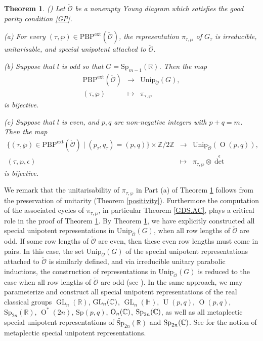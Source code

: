 \documentclass[lang = american]{ems-icm} %
\newcommand{\Z}{\mathbb{Z}}
\newcommand{\R}{\mathbb R}
\def\Sp{{\mathrm{Sp}}}
\newcommand{\GL}{\operatorname{GL}}
\newcommand{\oO}{\operatorname{O}}
\newcommand{\oU}{\operatorname{U}}
\newcommand{\CO}{{\mathcal {O}}}
\numberwithin{equation}{section}
\newtheorem{thm}{Theorem}[section]
\theoremstyle{remark}
\newtheorem*{remark}{Remark}
\begin{document}

\begin{thm}\emph{(\cite{BMSZ3})}
\label{thmclassify} Let $\check \CO$ be a nonempty Young diagram which satisfies the good parity condition \eqref{GP}.

\noindent (a) For every $(\tau,\wp)\in \mathrm{PBP}^{\mathrm{ext}}(\check \CO)$, the representation $\pi_{\tau,\wp}$ of $G_\tau$  is irreducible, unitarisable, and special unipotent attached to $\check \CO$.

\noindent  (b) Suppose that $l$ is odd so that $G=\Sp_{m-1}(\R)$. Then the map
\[
\begin{array}{rcl}
\mathrm{PBP}^{\mathrm{ext}}(\check \CO)&\rightarrow &\mathrm{Unip}_{\check \CO}(G),\\
  (\tau,\wp) &\mapsto& \pi_{\tau,\wp}
  \end{array}
\]
is bijective.

\noindent  (c) Suppose that $l$ is even, and $p,q$ are non-negative integers with $p+q=m$. Then the map
\[
\begin{array}{rcl}
\{(\tau, \wp)\in\mathrm{PBP}^{\mathrm{ext}}(\check \CO)\mid (p_\tau,q_\tau)=(p,q)\} \times \Z/2\Z&\rightarrow &\mathrm{Unip}_{\check \CO}(\oO(p,q)),\\
  (\tau, \wp, \epsilon)&\mapsto& \pi_{\tau,\wp}\otimes \det^\epsilon
  \end{array}
\]
is bijective.


\end{thm}

We remark that the unitarisability of $\pi_{\tau,\wp}$ in Part (a) of Theorem \ref{thmclassify} follows from the preservation of unitarity (Theorem \ref{positivity}). Furthermore the
computation of the associated cycles of $\pi_{\tau,\wp}$, in particular Theorem \ref{GDS.AC}, plays a critical role in the proof of Theorem \ref{thmclassify}.
By Theorem \ref{thmclassify}, we have explicitly constructed all special unipotent representations in $\mathrm{Unip}_{\check \CO}(G)$, when all row lengths of $\check \CO$ are odd. If some row lengths of $\check \CO$ are even, then these even row lengths must come in pairs. In this case, the set $\mathrm{Unip}_{\check \CO}(G)$ of the special unipotent representations attached to $\check \CO$ is similarly defined, and via irreducible unitary parabolic inductions,  the construction of representations in  $\mathrm{Unip}_{\check \CO}(G)$ is reduced to the case when all row lengths of $\check \CO$ are odd (see \cite{BMSZ2}). In the same approach, we may parameterize and construct all special unipotent representations of the real classical groups $\GL_n(\R)$, $\GL_n(\C)$, $\GL_n(\mathbb H)$, $\oU(p,q)$, $\oO(p,q)$, $\Sp_{2n}(\R)$, $\oO^*(2n)$, $\Sp(p,q)$,  $\oO_n(\C)$, $\Sp_{2n}(\C)$, as well as all metaplectic special unipotent representations of $\widetilde \Sp_{2n}(\R)$ and $\Sp_{2n}(\C)$. See \cite{BMSZ1} for the notion of metaplectic special unipotent representations.
\end{document}
